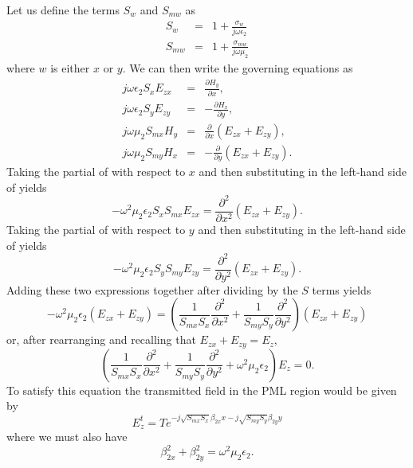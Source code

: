 Let us define the terms $S_w$ and $S_{mw}$ as
\begin{eqnarray}
   S_w &=& 1 + \frac{\sigma_w}{j\omega\epsilon_2} \\
   S_{mw} &=& 1 + \frac{\sigma_{mw}}{j\omega\mu_2}
\end{eqnarray}
where $w$ is either $x$ or $y$.  We can then write the governing
equations as 
\begin{eqnarray}
  j\omega\epsilon_2 S_x E_{zx} &=& \frac{\partial H_y}{\partial x}, 
    \label{eq:ezxSplit} \\
  j\omega\epsilon_2 S_y E_{zy} &=& -\frac{\partial H_x}{\partial y},
    \label{eq:ezySplit} \\
  j\omega\mu_2 S_{mx} H_y &=& 
    \frac{\partial}{\partial x} \left(E_{zx}+E_{zy}\right),
    \label{eq:hySplit} \\
  j\omega\mu_2 S_{my} H_x &=& 
    -\frac{\partial}{\partial y} \left(E_{zx}+E_{zy}\right).
    \label{eq:hxSplit}
\end{eqnarray}
Taking the partial of  with respect to $x$ and then
substituting in the left-hand side of  yields
\begin{equation}
  -\omega^2\mu_2\epsilon_2 S_x S_{mx} E_{zx} =
    \frac{\partial^2}{\partial x^2} \left(E_{zx}+E_{zy}\right).
\end{equation}
Taking the partial of  with respect to $y$ and then
substituting in the left-hand side of  yields
\begin{equation}
  -\omega^2\mu_2\epsilon_2 S_y S_{my} E_{zy} =
    \frac{\partial^2}{\partial y^2} \left(E_{zx}+E_{zy}\right).
\end{equation}
Adding these two expressions together after dividing by the $S$ terms
yields
\begin{equation}
  -\omega^2\mu_2\epsilon_2 \left(E_{zx} + E_{zy}\right) =
  \left(\frac{1}{S_{mx}S_x} \frac{\partial^2}{\partial x^2} +
        \frac{1}{S_{my}S_y}  \frac{\partial^2}{\partial y^2}\right)
  \left(E_{zx} + E_{zy}\right)
\end{equation}
or, after rearranging and recalling that $E_{zx} + E_{zy} = E_z$,
\begin{equation}
  \left(\frac{1}{S_{mx}S_x} \frac{\partial^2}{\partial x^2} +
        \frac{1}{S_{my}S_y}  \frac{\partial^2}{\partial y^2} +
        \omega^2\mu_2\epsilon_2
  \right) E_z = 0.
\end{equation}
To satisfy this equation the transmitted field in the PML region would
be given by
\begin{equation}
  E_z^t = T e^{-j\sqrt{S_{mx}S_x}\beta_{2x} x -j\sqrt{S_{my}S_y}\beta_{2y} y}
\end{equation}
where we must also have
\begin{equation}
  \beta_{2x}^2 + \beta_{2y}^2 = \omega^2 \mu_2\epsilon_2.
\end{equation}

